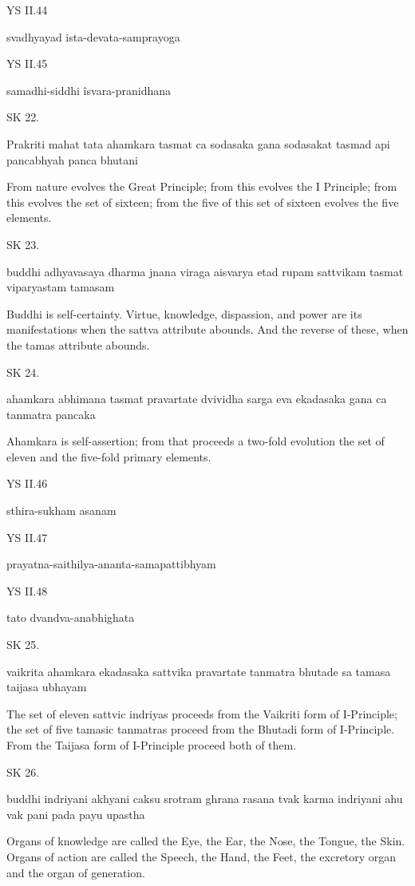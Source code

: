 YS II.44

svadhyayad ista-devata-samprayoga

YS II.45

samadhi-siddhi îsvara-pranidhana

SK 22.

Prakriti mahat tata ahamkara tasmat ca sodasaka gana
sodasakat tasmad api pancabhyah panca bhutani

From nature evolves the Great Principle;
from this evolves the I Principle;
from this evolves the set of sixteen;
from the five of this set of sixteen evolves the five elements.

SK 23.

buddhi adhyavasaya dharma jnana viraga aisvarya
etad rupam sattvikam tasmat viparyastam tamasam

Buddhi is self-certainty.
Virtue, knowledge, dispassion, and power are its manifestations
when the sattva attribute abounds.
And the reverse of these, when the tamas attribute abounds.

SK 24.

ahamkara abhimana tasmat pravartate dvividha sarga eva
ekadasaka gana ca tanmatra pancaka

Ahamkara is self-assertion;
from that proceeds a two-fold evolution
the set of eleven and the five-fold primary elements.

YS II.46

sthira-sukham asanam

YS II.47

prayatna-saithilya-ananta-samapattibhyam

YS II.48

tato dvandva-anabhighata

SK 25.

vaikrita ahamkara ekadasaka sattvika pravartate
tanmatra bhutade sa tamasa taijasa ubhayam

The set of eleven sattvic indriyas proceeds from the Vaikriti form of I-Principle;
the set of five tamasic tanmatras proceed from the Bhutadi form of I-Principle.
From the Taijasa form of I-Principle proceed both of them.

SK 26.

buddhi indriyani akhyani caksu srotram ghrana rasana tvak
karma indriyani ahu vak pani pada payu upastha

Organs of knowledge are called the Eye, the Ear, the Nose, the Tongue, the Skin.
Organs of action are called the Speech, the Hand, the Feet, the excretory organ and the organ of generation.

